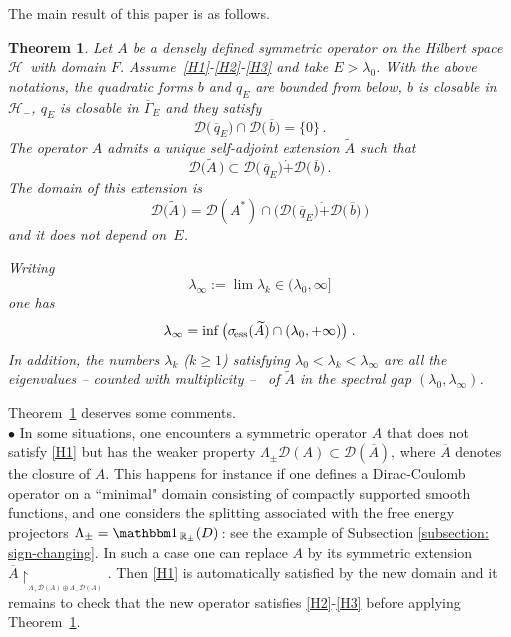 \documentclass[12pt,reqno]{amsart}
\newtheorem{theorem}{Theorem}
\newcommand{\R}{{\mathbb R}}
\renewcommand{\(}{\left(}
\renewcommand{\)}{\right)}
\begin{document}
\noindent The main result of this paper is as follows.
\begin{theorem}\label{Theorem:thm1} Let $A$ be a densely defined symmetric operator on the Hilbert space $\mathcal H\,$ with domain $F$. Assume~\eqref{H1}-\eqref{H2}-\eqref{H3} and take $E>\lambda_0$. With the above notations, the quadratic forms $b$ and $q_E$ are bounded from below, $b$ is closable in $\mathcal H_-$, $q_E$ is closable in $\overline \Gamma_E$ and they satisfy
\[
\mathcal D\big(\,\overline{q}_E\big)\cap\mathcal D\big(\,\overline{b}\big)=\big\{0\big\}\,.
\]
The operator $A$ admits a unique self-adjoint extension $\widetilde A$ such that 
\[
\mathcal D\big(\widetilde A\,\big)\subset \mathcal D\big(\,\overline{q}_E\big)\dot{+}\mathcal D\big(\,\overline{b}\big)\,.
\]
The domain of this extension is
\[
\mathcal D\big(\widetilde A\,\big)=\mathcal D(A^*)\cap \Big( \mathcal D\big(\,\overline{q}_E\big)\dot{+}\mathcal D\big(\,\overline{b}\big)\, \Big)
\]
and it does not depend on~$E$.\smallskip

\noindent
Writing
\[\lambda_\infty:=\lim\lambda_k\in(\lambda_0,\infty]\]
one has
 \[
\lambda_\infty= \inf \big(\sigma_{\!\rm ess} (\widetilde A) \cap (\lambda_0, + \infty)\big)\;.
\]
In addition, the numbers $\lambda_k$ ($k\ge 1$) satisfying $\lambda_0<\lambda_k<\lambda_\infty$ are all the eigenvalues -- counted with multiplicity -- \, of $\widetilde A$ in the spectral gap $(\lambda_0,\lambda_\infty)$.
\end{theorem}
\noindent Theorem~\ref{Theorem:thm1} deserves some comments.
\\[2pt] $\bullet$
In some situations, one encounters a symmetric operator $A$ that does not satisfy \eqref{H1} but has the weaker property $\Lambda_\pm \mathcal D(A)\subset \mathcal D(\overline{A})$, where $\overline{A}$ denotes the closure of $A$. This happens for instance if one defines a Dirac-Coulomb operator on a ``minimal" domain consisting of compactly supported smooth functions, and one considers the splitting associated with the free energy projectors $\Lambda_\pm=\mathbbm 1_{\,\R_{\pm}}(D)\,$: see the example of Subsection \ref{subsection: sign-changing}. In such a case one can replace $A$ by its symmetric extension $\overline{A}\upharpoonright_{_{\Lambda_+ \mathcal D(A)\oplus\Lambda_-\mathcal D(A)}}$. Then \eqref{H1} is automatically satisfied by the new domain and it remains to check that the new operator satisfies \eqref{H2}-\eqref{H3} before applying Theorem~\ref{Theorem:thm1}.
\end{document}
